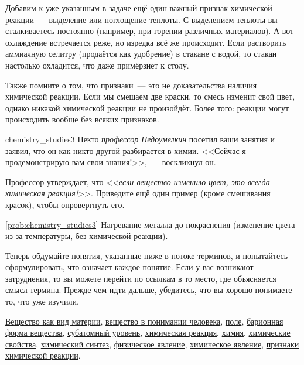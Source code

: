Добавим к уже указанным в задаче ещё один важный признак химической реакции~--- выделение или поглощение теплоты. С выделением теплоты вы сталкиваетесь постоянно (например, при горении различных материалов). А вот охлаждение встречается реже, но изредка всё же происходит. Если растворить аммиачную селитру (продаётся как удобрение) в стакане с водой, то стакан настолько охладится, что даже примёрзнет к столу.

Также помните о том, что признаки~--- это не доказательства наличия химической реакции. Если мы смешаем две краски, то смесь изменит свой цвет, однако никакой химической реакции не произойдёт. Более того: реакции могут происходить вообще без всяких признаков.

\begin{problem}{}{chemistry_studies3}
    Некто \textit{профессор Недоумелкин} посетил ваши занятия и заявил, что он как никто другой разбирается в химии. <<Сейчас я продемонстрирую вам свои знания!>>,~--- воскликнул он.

    \medskip

    Профессор утверждает, что <<\emph{если вещество изменило цвет, это всегда химическая реакция!}>>. Приведите ещё один пример (кроме смешивания красок), чтобы опровергнуть его.

    \begin{sol}{\ref{prob:chemistry_studies3}}
        Нагревание металла до покраснения (изменение цвета из\nobreakdash-за температуры, без химической реакции).
    \end{sol}
\end{problem}

Теперь обдумайте понятия, указанные ниже в потоке терминов, и попытайтесь сформулировать, что означает каждое понятие. Если у вас возникают затруднения, то вы можете перейти по ссылкам в то место, где объясняется смысл термина. Прежде чем идти дальше, убедитесь, что вы хорошо понимаете то, что уже изучили.

\begin{termlist}
    \hyperref[term:substance_matter]{Вещество как вид материи},
    \hyperref[term:substance_human]{вещество в понимании человека},
    \hyperref[term:field]{поле},
    \hyperref[term:baryonic_matter]{барионная форма вещества},
    \hyperref[term:subatomic_level]{субатомный уровень},
    \hyperref[term:chemical_reaction]{химическая реакция},
    \hyperref[term:chemistry]{химия},
    \hyperref[term:chemical_properties]{химические свойства},
    \hyperref[term:chemical_synthesis]{химический синтез},
    \hyperref[term:physical_phenomenon]{физическое явление},
    \hyperref[term:chemical_phenomenon]{химическое явление},
    \hyperref[term:signs_of_a_chemical_reaction]{признаки химической реакции}.
\end{termlist}

